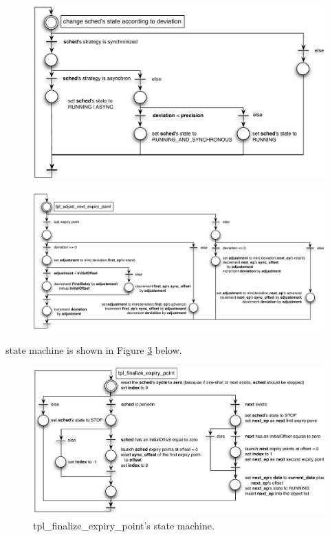 \begin{figure}[H] %
   \centering
   \includegraphics[scale=0.6]{pictures/STprocessingChangeState.pdf}  
   \label{fig:STprocessingChangeState}
\end{figure}

\begin{figure}[H] %
   \centering
   \includegraphics[scale=0.6]{pictures/STprocessingTplAdjust.pdf}  
   \label{fig:STprocessingTplAdjust}
\end{figure}

 state machine is shown in Figure \ref{fig:STprocessingTplFinalize} below.

\begin{figure}[H] %
   \centering
   \includegraphics[scale=0.6]{pictures/STprocessingTplFinalize.pdf}  
   \caption{tpl_finalize_expiry_point's state machine.}
   \label{fig:STprocessingTplFinalize}
\end{figure} 

















